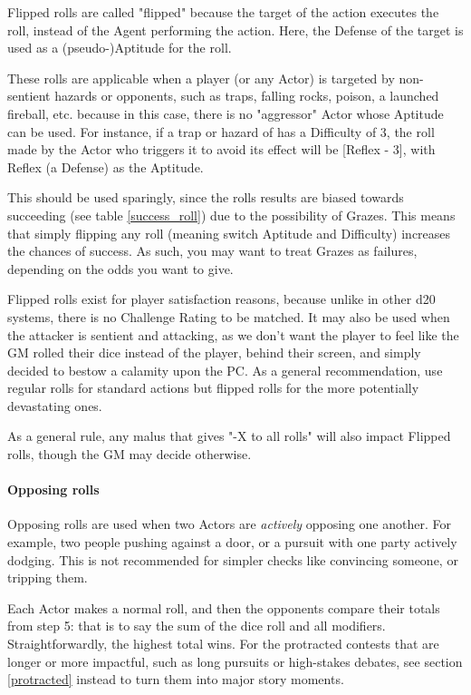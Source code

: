 Flipped rolls are called "flipped" because the target of the action executes the roll, instead of the Agent performing the action. Here, the Defense of the target is used as a (pseudo-)Aptitude for the roll.

These rolls are applicable when a player (or any Actor) is targeted by non-sentient hazards or opponents, such as traps, falling rocks, poison, a launched fireball, etc. because in this case, there is no "aggressor" Actor whose Aptitude can be used. For instance, if a trap or hazard of has a Difficulty of 3, the roll made by the Actor who triggers it to avoid its effect will be [Reflex - 3], with Reflex (a Defense) as the Aptitude.

This should be used sparingly, since the rolls results are biased towards succeeding (see table \ref{success_roll}) due to the possibility of Grazes. This means that simply flipping any roll (meaning switch Aptitude and Difficulty) increases the chances of success. As such, you may want to treat Grazes as failures, depending on the odds you want to give. 

Flipped rolls exist for player satisfaction reasons, because unlike in other d20 systems, there is no Challenge Rating to be matched. It may also be used when the attacker is sentient and attacking, as we don't want the player to feel like the GM rolled their dice instead of the player, behind their screen, and simply decided to bestow a calamity upon the PC. As a general recommendation, use regular rolls for standard actions but flipped rolls for the more potentially devastating ones.

As a general rule, any malus that gives "-X to all rolls" will also impact Flipped rolls, though the GM may decide otherwise.


\paragraph{Opposing rolls} 

Opposing rolls are used when two Actors are \textit{actively} opposing one another. For example, two people pushing against a door, or a pursuit with one party actively dodging. This is not recommended for simpler checks like convincing someone, or tripping them.

Each Actor makes a normal roll, and then the opponents compare their totals from step 5: that is to say the sum of the dice roll and all modifiers. Straightforwardly, the highest total wins. For the protracted contests that are longer or more impactful, such as long pursuits or high-stakes debates, see section \ref{protracted} instead to turn them into major story moments.

